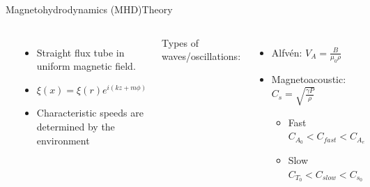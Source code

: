 \documentclass[table]{beamer}
\begin{document}
\begin{frame}{Magnetohydrodynamics (MHD)}{Theory}
    \begin{columns}
        \includegraphics[width=\textwidth]{cylinder.png}
        \begin{itemize}
            \item Straight flux tube in uniform magnetic field.
            \item $ \xi(x) = \xi(r)e^{i(kz+m{\phi})} $
            \item Characteristic speeds are determined by the
                environment
        \end{itemize}
    Types of waves/oscillations:
    \begin{itemize}
        \item Alfv\'en: $V_A = \frac{B}{\mu_0\rho}$
        \item Magnetoacoustic: $C_s = \sqrt{\frac{\gamma P}{\rho}}$
            \begin{itemize}
                \item Fast $C_{A_0} < C_{fast} < C_{A_e} $
                \item Slow $C_{T_0} < C_{slow} < C_{s_0} $
            \end{itemize}
    \end{itemize}
    \end{columns}
\end{frame}%
\end{document}
